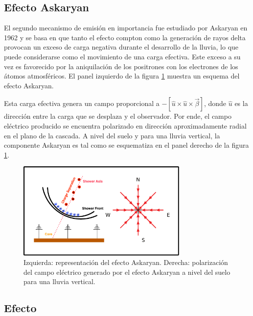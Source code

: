 \subsection{Efecto Askaryan}
\label{sbsc:ask_emision}
	
	El segundo mecanismo de emisión en importancia fue estudiado por Askaryan en 1962 \cite{askaryan1962} y se basa en que tanto el efecto compton como la generaci\'on de rayos delta provocan un exceso de carga negativa durante el desarrollo de la lluvia, lo que puede considerarse como el movimiento de una carga efectiva.
	Este exceso a su vez es favorecido por la aniquilaci\'on de los positrones con los electrones de los \'atomos atmosf\'ericos. 
	El panel izquierdo de la figura \ref{fig:ask_sketch} muestra un esquema del efecto Askaryan.
	
	Esta carga efectiva genera un campo proporcional a $-\left[\hat u \times \hat u \times \vec\beta\right]$, donde $\hat u$ es la direcci\'on entre la carga que se desplaza y el observador\cite{jackson:1998}.
	Por ende, el campo eléctrico producido se encuentra polarizado en dirección aproximadamente radial en el plano de la cascada.
	A nivel del suelo y para una lluvia vertical, la componente Askaryan es tal como se esquematiza en el panel derecho de la figura \ref{fig:ask_sketch}.
	
	\begin{figure}[ht!]
		\centering
		\includegraphics[width=0.75\textwidth]{fig/EASRadio/ask_sketch}
		\caption{\label{fig:ask_sketch} Izquierda: representaci\'on del efecto Askaryan.
		Derecha: polarización del campo eléctrico generado por el efecto Askaryan a nivel del suelo para una lluvia vertical.}
	\end{figure}
	
	
	
\subsection{Efecto \cher{}}
\label{sbsc:cher_emision}
	
